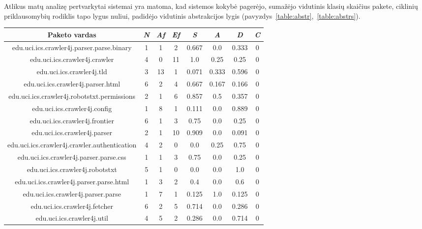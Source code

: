 Atlikus matų analizę pertvarkytai sistemai yra matoma, kad sistemos kokybė pagerėjo,
sumažėjo vidutinis klasių skaičius pakete, ciklinių priklausomybių rodiklis tapo lygus nuliui,
padidėjo vidutinis abstrakcijos lygis (pavyzdys~\ref{table:abstr},~\ref{table:abstrs}).
\begin{center}
    \begin{tabular}{|c|c|c|c|c|c|c|c|}
        \hline
        Paketo vardas & \textit{N} & \textit{Af} & \textit{Ef} & \textit{S} & \textit{A} & \textit{D} & \textit{C} \\ [0.5ex]
        \hline\hline
        edu.uci.ics.crawler4j.parser.parse.binary & 1 & 1 & 2 & 0.667 & 0.0 & 0.333 & 0 \\
        \hline
        edu.uci.ics.crawler4j.crawler & 4 & 0 & 11 & 1.0 & 0.25 & 0.25 & 0 \\
        \hline
        edu.uci.ics.crawler4j.tld & 3 & 13 & 1 & 0.071 & 0.333 & 0.596 & 0 \\
        \hline
        edu.uci.ics.crawler4j.parser.html & 6 & 2 & 4 & 0.667 & 0.167 & 0.166 & 0 \\
        \hline
        edu.uci.ics.crawler4j.robotstxt.permissions & 2 & 1 & 6 & 0.857 & 0.5 & 0.357 & 0 \\
        \hline
        edu.uci.ics.crawler4j.config & 1 & 8 & 1 & 0.111 & 0.0 & 0.889 & 0 \\
        \hline
        edu.uci.ics.crawler4j.frontier & 6 & 1 & 3 & 0.75 & 0.0 & 0.25 & 0 \\
        \hline
        edu.uci.ics.crawler4j.parser & 2 & 1 & 10 & 0.909 & 0.0 & 0.091 & 0\\
        \hline
        edu.uci.ics.crawler4j.crawler.authentication & 4 & 2 & 0 & 0.0 & 0.25 & 0.75 & 0 \\
        \hline
        edu.uci.ics.crawler4j.parser.parse.css & 1 & 1 & 3 & 0.75 & 0.0 & 0.25 & 0 \\
        \hline
        edu.uci.ics.crawler4j.robotstxt & 5 & 1 & 0 & 0.0 & 0.0 & 1.0 & 0 \\
        \hline
        edu.uci.ics.crawler4j.parser.parse.html & 1 & 3 & 2 & 0.4 & 0.0 & 0.6 & 0 \\
        \hline
        edu.uci.ics.crawler4j.parser.parse & 1 & 7 & 1 & 0.125 & 1.0 & 0.125 & 0\\
        \hline
        edu.uci.ics.crawler4j.fetcher & 6 & 2 & 5 & 0.714 & 0.0 & 0.286 & 0 \\
        \hline
        edu.uci.ics.crawler4j.util & 4 & 5 & 2 & 0.286 & 0.0 & 0.714 & 0 \\

\end{tabular}
\end{center}
